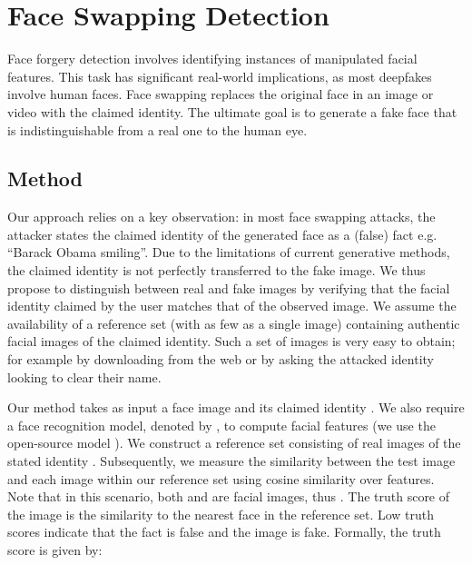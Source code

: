 \documentclass{article} \usepackage{iclr2024_conference,times}
\begin{document}
\section{Face Swapping Detection}
\label{sec:identity}
Face forgery detection involves identifying instances of manipulated facial features. This task has significant real-world implications, as most deepfakes involve human faces. Face swapping replaces the original face in an image or video with the claimed identity. The ultimate goal is to generate a fake face that is indistinguishable from a real one to the human eye. 

\subsection{Method}
Our approach relies on a key observation: in most face swapping attacks, the attacker states the claimed identity of the generated face as a (false) fact e.g. “Barack Obama smiling”. Due to the limitations of current generative methods, the claimed identity is not perfectly transferred to the fake image. We thus propose to distinguish between real and fake images by verifying that the facial identity claimed by the user matches that of the observed image. We assume the availability of a reference set (with as few as a single image) containing authentic facial images of the claimed identity. Such a set of images is very easy to obtain; for example by downloading from the web or by asking the attacked identity looking to clear their name.

Our method takes as input a face image  and its claimed identity . We also require a face recognition model, denoted by , to compute facial features (we use the open-source model \citet{attention_face_recognition}). We construct a reference set  consisting of real images of the stated identity . Subsequently, we measure the similarity between the test image  and each image within our reference set using cosine similarity over  features. Note that in this scenario, both  and  are facial images, thus . The truth score  of the image  is the similarity to the nearest face in the reference set. Low truth scores indicate that the fact is false and the image is fake. Formally, the truth score is given by:
\end{document}
